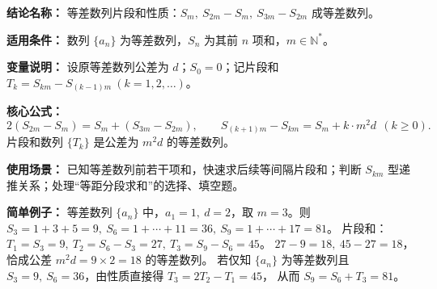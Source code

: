 \textbf{结论名称：} 等差数列片段和性质：\(S_m,\ S_{2m}-S_m,\ S_{3m}-S_{2m}\) 成等差数列。

\textbf{适用条件：} 数列 \(\{a_n\}\) 为等差数列，\(S_n\) 为其前 \(n\) 项和，\(m\in\mathbb{N}^*\)。

\textbf{变量说明：} 设原等差数列公差为 \(d\)；\(S_0=0\)；记片段和 \(T_k=S_{km}-S_{(k-1)m}\ (k=1,2,\dots)\)。

\textbf{核心公式：}
\[
\boxed{2(S_{2m}-S_m)=S_m+(S_{3m}-S_{2m})},\qquad 
\boxed{S_{(k+1)m}-S_{km}=S_m+k\cdot m^2 d\ \ (k\ge 0)}.
\]
片段和数列 \(\{T_k\}\) 是公差为 \(m^2 d\) 的等差数列。

\textbf{使用场景：} 已知等差数列前若干项和，快速求后续等间隔片段和；判断 \(S_{km}\) 型递推关系；处理“等距分段求和”的选择、填空题。

\textbf{简单例子：} 等差数列 \(\{a_n\}\) 中，\(a_1=1,\ d=2\)，取 \(m=3\)。则
\(S_3=1+3+5=9,\ S_6=1+\cdots+11=36,\ S_9=1+\cdots+17=81\)。
片段和：\(T_1=S_3=9,\ T_2=S_6-S_3=27,\ T_3=S_9-S_6=45\)。
\(27-9=18,\ 45-27=18\)，恰成公差 \(m^2 d=9\times2=18\) 的等差数列。
若仅知 \(\{a_n\}\) 为等差数列且 \(S_3=9,\ S_6=36\)，由性质直接得 \(T_3=2T_2-T_1=45\)，
从而 \(S_9=S_6+T_3=81\)。